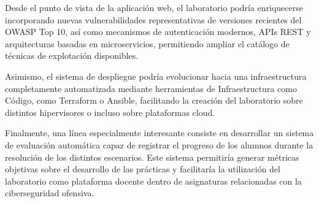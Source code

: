 Desde el punto de vista de la aplicación web, el laboratorio podría enriquecerse incorporando nuevas vulnerabilidades representativas de versiones recientes del OWASP Top 10, así como mecanismos de autenticación modernos, APIs REST y arquitecturas basadas en microservicios, permitiendo ampliar el catálogo de técnicas de explotación disponibles.

Asimismo, el sistema de despliegue podría evolucionar hacia una infraestructura completamente automatizada mediante herramientas de Infraestructura como Código, como Terraform o Ansible, facilitando la creación del laboratorio sobre distintos hipervisores o incluso sobre plataformas cloud.

Finalmente, una línea especialmente interesante consiste en desarrollar un sistema de evaluación automática capaz de registrar el progreso de los alumnos durante la resolución de los distintos escenarios. Este sistema permitiría generar métricas objetivas sobre el desarrollo de las prácticas y facilitaría la utilización del laboratorio como plataforma docente dentro de asignaturas relacionadas con la ciberseguridad ofensiva.